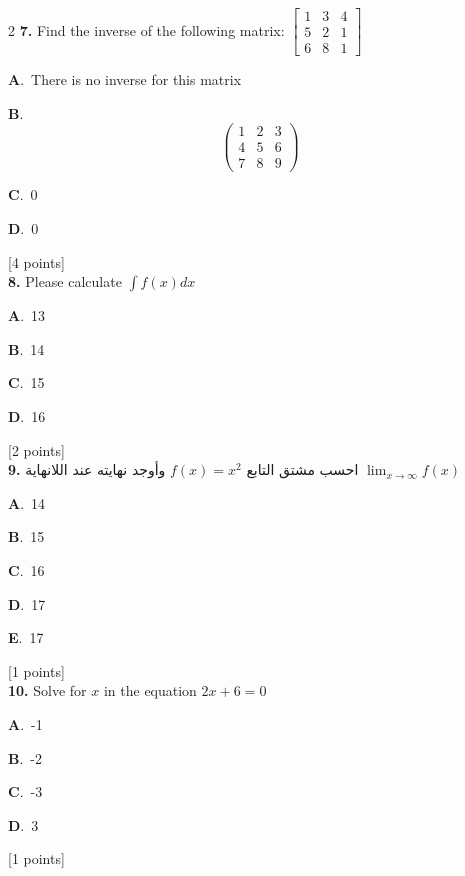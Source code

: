 \documentclass[12pt]{article}
\newcommand{\choice}[3]{%
  \noindent\textbf{#1}.~#2\hfill#3\par\vspace{0.25em}
}
\begin{document}
\begin{multicols}{2}
\noindent \textbf{\textenglish{7.}} {\textenglish{Find the inverse of the following matrix: }}\(\begin{bmatrix} 1 & 3 & 4 \\ 5 & 2 & 1 \\ 6 & 8 & 1 \end{bmatrix}\)

\noindent\choice{A}{{\textenglish{There is no inverse for this matrix}}}{}
\noindent\choice{B}{\[\begin{pmatrix} 1 & 2 & 3 \\ 4 & 5 & 6 \\ 7 & 8 & 9  \end{pmatrix}\]}{}
\noindent\choice{C}{{\textenglish{0}}}{}
\noindent\choice{D}{{\textenglish{0}}}{}
\hfill {\textenglish{[4 points]}}\\[0.5em]

\noindent \textbf{\textenglish{8.}} {\textenglish{Please calculate }}\(\int f(x)dx\)

\noindent\choice{A}{{\textenglish{13}}}{}
\noindent\choice{B}{{\textenglish{14}}}{}
\noindent\choice{C}{{\textenglish{15}}}{}
\noindent\choice{D}{{\textenglish{16}}}{}
\hfill {\textenglish{[2 points]}}\\[0.5em]

\noindent \textbf{\textenglish{9.}} {\textarabic{احسب مشتق التابع }}\( f(x) = x^2\){\textarabic{ وأوجد نهايته عند اللانهاية }}\(\lim_{x \to \infty}f(x)\)

\noindent\choice{A}{{\textenglish{14}}}{}
\noindent\choice{B}{{\textenglish{15}}}{}
\noindent\choice{C}{{\textenglish{16}}}{}
\noindent\choice{D}{{\textenglish{17}}}{}
\noindent\choice{E}{{\textenglish{17}}}{}
\hfill {\textenglish{[1 points]}}\\[0.5em]

\noindent \textbf{\textenglish{10.}} {\textenglish{Solve for }}\(x \){\textenglish{ in the equation }}\(2x+6 = 0 \)

\noindent\choice{A}{{\textenglish{-1}}}{}
\noindent\choice{B}{{\textenglish{-2}}}{}
\noindent\choice{C}{{\textenglish{-3}}}{}
\noindent\choice{D}{{\textenglish{3}}}{}
\hfill {\textenglish{[1 points]}}\\[0.5em]


\end{multicols}
\end{document}
